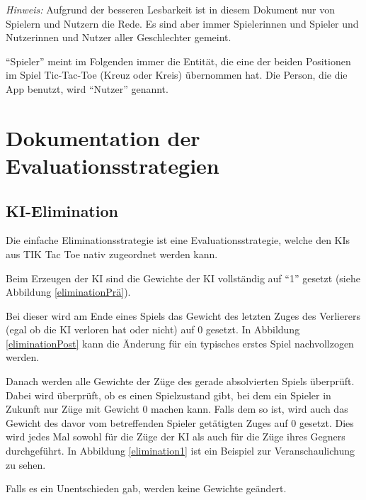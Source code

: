 \documentclass[titlepage]{scrartcl}
\title{\TicTacToe}
\subtitle{Dokumentation}
\date{Stand: \today}
\author{Jonas, Luis, Leonid}
\newcommand{\TicTacToe}{TI\reflectbox K Tac Toe}
\begin{document}
\maketitle

\emph{Hinweis:} Aufgrund der besseren Lesbarkeit ist in diesem Dokument nur von Spielern und Nutzern die Rede.
Es sind aber immer Spielerinnen und Spieler und Nutzerinnen und Nutzer aller Geschlechter gemeint.

"`Spieler"' meint im Folgenden immer die Entität, die eine der beiden Positionen im Spiel Tic-Tac-Toe (Kreuz oder Kreis) übernommen hat.
Die Person, die die App benutzt, wird "`Nutzer"' genannt.
\section{Dokumentation der Evaluationsstrategien}
\subsection{KI-Elimination}
Die einfache Eliminationsstrategie ist eine Evaluationsstrategie, welche den KIs aus \TicTacToe{} nativ zugeordnet werden kann.

Beim Erzeugen der KI sind die Gewichte der KI vollständig auf "`1"' gesetzt (siehe Abbildung \ref{eliminationPrä}).

Bei dieser wird am Ende eines Spiels das Gewicht des letzten Zuges des Verlierers (egal ob die KI verloren hat oder nicht) auf \glqq{}0\grqq{} gesetzt.
In Abbildung \ref{eliminationPost} kann die Änderung für ein typisches erstes Spiel nachvollzogen werden.

Danach werden alle Gewichte der Züge des gerade absolvierten Spiels überprüft. Dabei wird überprüft, ob es einen Spielzustand gibt, bei dem ein Spieler in Zukunft nur Züge mit Gewicht 0 machen kann.
Falls dem so ist, wird auch das Gewicht des davor vom betreffenden Spieler getätigten Zuges auf \glqq{}0\grqq{} gesetzt.
Dies wird jedes Mal sowohl für die Züge der KI als auch für die Züge ihres Gegners durchgeführt.
In Abbildung \ref{elimination1} ist ein Beispiel zur Veranschaulichung zu sehen.

Falls es ein Unentschieden gab, werden keine Gewichte geändert. 
\end{document}
